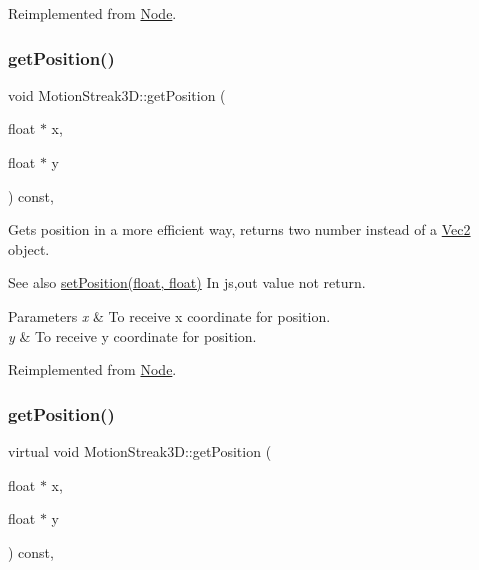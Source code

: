 Reimplemented from \hyperlink{classNode_a1c78c6feace91b27b6cbb12ee16e8eb0}{Node}.

\mbox{\label{classMotionStreak3D_a16c2911514702c9d808d1afad8d0ece3}} 
\subsubsection{\texorpdfstring{get\+Position()}{getPosition()}\hspace{0.1cm}{\footnotesize\ttfamily [3/4]}}
{\footnotesize\ttfamily void Motion\+Streak3\+D\+::get\+Position (\begin{DoxyParamCaption}\item[{float $\ast$}]{x,  }\item[{float $\ast$}]{y }\end{DoxyParamCaption}) const\hspace{0.3cm}{\ttfamily [override]}, {\ttfamily [virtual]}}

Gets position in a more efficient way, returns two number instead of a \hyperlink{classVec2}{Vec2} object.

\begin{DoxySeeAlso}{See also}
{\ttfamily \hyperlink{classMotionStreak3D_ada67cecb8a81f0f48615d24eb9fc2373}{set\+Position(float, float)}} In js,out value not return.
\end{DoxySeeAlso}

\begin{DoxyParams}{Parameters}
{\em x} & To receive x coordinate for position. \\
\hline
{\em y} & To receive y coordinate for position. \\
\hline
\end{DoxyParams}


Reimplemented from \hyperlink{classNode_a216f30e9a2dda896b2ffff1885b33a98}{Node}.

\mbox{\label{classMotionStreak3D_aca30ce7817540e8cf038cf11adc58154}} 
\subsubsection{\texorpdfstring{get\+Position()}{getPosition()}\hspace{0.1cm}{\footnotesize\ttfamily [4/4]}}
{\footnotesize\ttfamily virtual void Motion\+Streak3\+D\+::get\+Position (\begin{DoxyParamCaption}\item[{float $\ast$}]{x,  }\item[{float $\ast$}]{y }\end{DoxyParamCaption}) const\hspace{0.3cm}{\ttfamily [override]}, {\ttfamily [virtual]}}

